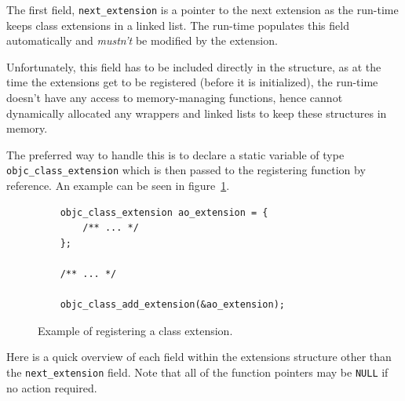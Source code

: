 The first field, \verb=next_extension= is a pointer to the next extension as the run-time keeps class extensions in a linked list. The run-time populates this field automatically and \emph{mustn't} be modified by the extension. 

Unfortunately, this field has to be included directly in the structure, as at the time the extensions get to be registered (before it is initialized), the run-time doesn't have any access to memory-managing functions, hence cannot dynamically allocated any wrappers and linked lists to keep these structures in memory.

The preferred way to handle this is to declare a static variable of type \newline{}\verb=objc_class_extension= which is then passed to the registering function by reference. An example can be seen in figure~\ref{fig:class_ext_struct_example}.

\begin{figure}[here] 
  \begin{verbatim}
    objc_class_extension ao_extension = { 
        /** ... */ 
    };
    
    /** ... */
    
    objc_class_add_extension(&ao_extension);
  \end{verbatim}
  \centering{}
  \caption{Example of registering a class extension.}
  \label{fig:class_ext_struct_example}
\end{figure}


Here is a quick overview of each field within the extensions structure other than the \verb=next_extension= field. Note that all of the function pointers may be \texttt{NULL} if no action required.

